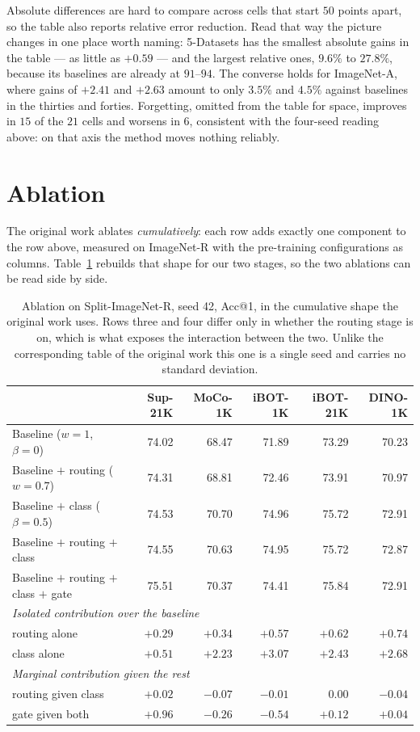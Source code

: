 \documentclass[runningheads]{llncs}
\begin{document}
Absolute differences are hard to compare across cells that start $50$ points
apart, so the table also reports relative error reduction. Read that way the
picture changes in one place worth naming: 5-Datasets has the smallest absolute
gains in the table --- as little as $+0.59$ --- and the largest relative ones,
$9.6\%$ to $27.8\%$, because its baselines are already at $91$--$94$. The
converse holds for ImageNet-A, where gains of $+2.41$ and $+2.63$ amount to only
$3.5\%$ and $4.5\%$ against baselines in the thirties and forties. Forgetting,
omitted from the table for space, improves in $15$ of the $21$ cells and worsens
in $6$, consistent with the four-seed reading above: on that axis the method
moves nothing reliably.

\section{Ablation}
\label{sec:ablation}

The original work ablates \emph{cumulatively}: each row adds exactly one
component to the row above, measured on ImageNet-R with the pre-training
configurations as columns. Table~\ref{tab:cumul} rebuilds that shape for our two
stages, so the two ablations can be read side by side.

\begin{table}
\caption{Ablation on Split-ImageNet-R, seed 42, Acc@1, in the cumulative shape
the original work uses. Rows three and four differ only in whether the routing
stage is on, which is what exposes the interaction between the two. Unlike the
corresponding table of the original work this one is a single seed and carries
no standard deviation.}
\label{tab:cumul}
\begin{tabular}{lrrrrr}
\hline
& Sup-21K & MoCo-1K & iBOT-1K & iBOT-21K & DINO-1K\\
\hline
Baseline ($w=1$, $\beta=0$)             & 74.02 & 68.47 & 71.89 & 73.29 & 70.23\\
Baseline $+$ routing ($w=0.7$)          & 74.31 & 68.81 & 72.46 & 73.91 & 70.97\\
Baseline $+$ class ($\beta=0.5$)        & 74.53 & 70.70 & 74.96 & 75.72 & 72.91\\
Baseline $+$ routing $+$ class          & 74.55 & 70.63 & 74.95 & 75.72 & 72.87\\
Baseline $+$ routing $+$ class $+$ gate & 75.51 & 70.37 & 74.41 & 75.84 & 72.91\\
\hline
\multicolumn{6}{l}{\emph{Isolated contribution over the baseline}}\\
routing alone & $+0.29$ & $+0.34$ & $+0.57$ & $+0.62$ & $+0.74$\\
class alone   & $+0.51$ & $+2.23$ & $+3.07$ & $+2.43$ & $+2.68$\\
\multicolumn{6}{l}{\emph{Marginal contribution given the rest}}\\
routing given class & $+0.02$ & $-0.07$ & $-0.01$ & $\ \ 0.00$ & $-0.04$\\
gate given both     & $+0.96$ & $-0.26$ & $-0.54$ & $+0.12$ & $+0.04$\\
\hline
\end{tabular}
\end{table}
\end{document}
